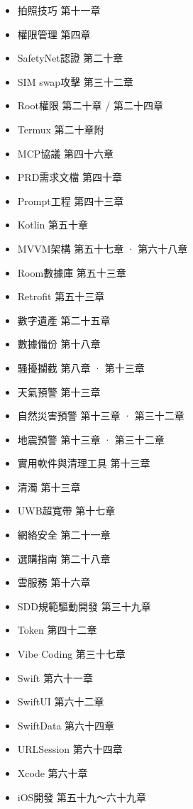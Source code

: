
\begin{itemize}
  \item 拍照技巧 第十一章
  \item 權限管理 第四章
  \item SafetyNet認證 第二十章
  \item SIM swap攻擊 第三十二章
  \item Root權限 第二十章 / 第二十四章
  \item Termux 第二十章附
  \item MCP協議 第四十六章
  \item PRD需求文檔 第四十章
  \item Prompt工程 第四十三章
  \item Kotlin 第五十章
  \item MVVM架構 第五十七章 · 第六十八章
  \item Room數據庫 第五十三章
  \item Retrofit 第五十三章
\end{itemize}


\begin{itemize}
  \item 數字遺產 第二十五章
  \item 數據備份 第十八章
  \item 騷擾攔截 第八章 · 第十三章
  \item 天氣預警 第十三章
  \item 自然災害預警 第十三章 · 第三十二章
  \item 地震預警 第十三章 · 第三十二章
  \item 實用軟件與清理工具 第十三章
  \item 清濁 第十三章
  \item UWB超寬帶 第十七章
  \item 網絡安全 第二十一章
  \item 選購指南 第二十八章
  \item 雲服務 第十六章
  \item SDD規範驅動開發 第三十九章
  \item Token 第四十二章
  \item Vibe Coding 第三十七章
  \item Swift 第六十一章
  \item SwiftUI 第六十二章
  \item SwiftData 第六十四章
  \item URLSession 第六十四章
  \item Xcode 第六十章
  \item iOS開發 第五十九～六十九章
\end{itemize}

